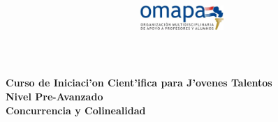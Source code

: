 \documentclass{article}
\title{
\begin{center}
\includegraphics[width=120px, height=40px]{omapa.jpg}\\
\end{center}
}
\begin{document}
\maketitle
\begin{center}
\bfseries{Curso de Iniciaci'on Cient'ifica para J'ovenes Talentos\\
Nivel Pre-Avanzado \\
Concurrencia y Colinealidad}
\end{center}




\end{document}
